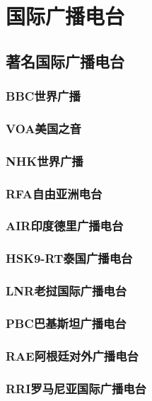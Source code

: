 \documentclass[12pt,UTF8]{ctexbook}
\begin{document}
\chapter{国际广播电台}

\section{著名国际广播电台}

\subsection{BBC世界广播}

\subsection{VOA美国之音}

\subsection{NHK世界广播}

\subsection{RFA自由亚洲电台}

\subsection{AIR印度德里广播电台}

\subsection{HSK9-RT泰国广播电台}

\subsection{LNR老挝国际广播电台}

\subsection{PBC巴基斯坦广播电台}

\subsection{RAE阿根廷对外广播电台}

\subsection{RRI罗马尼亚国际广播电台}
\end{document}
